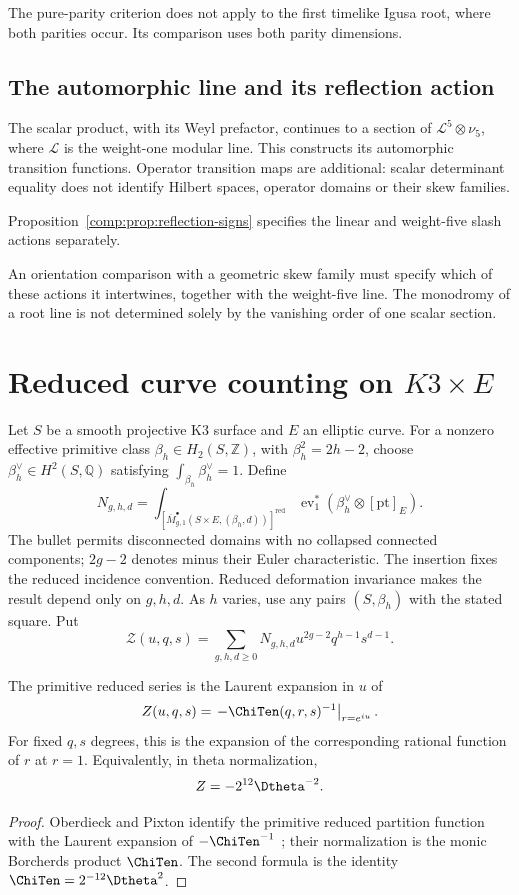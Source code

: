 The pure-parity criterion does not apply to the first timelike
Igusa root, where both parities occur. Its comparison uses both
parity dimensions.

\subsection{The automorphic line and its reflection action}
The scalar product, with its Weyl prefactor, continues to a section
of \(\mathcal L^5\otimes\nu_5\), where \(\mathcal L\) is
the weight-one modular line. This constructs its automorphic
transition functions. Operator transition maps are additional:
scalar determinant equality does not identify Hilbert spaces,
operator domains or their skew families.

Proposition~\ref{comp:prop:reflection-signs} specifies the linear
and weight-five slash actions separately.


An orientation comparison with a geometric skew family must specify
which of these actions it intertwines, together with the weight-five
line. The monodromy of a root line is not determined solely by the
vanishing order of one scalar section.

\section{Reduced curve counting on \texorpdfstring{$K3\times E$}{K3 x E}}
Let \(S\) be a smooth projective K3 surface and \(E\) an
elliptic curve. For a nonzero effective primitive class
\(\beta_h\in H_2(S,\mathbb Z)\), with \(\beta_h^2=2h-2\),
choose \(\beta_h^\vee\in H^2(S,\mathbb Q)\) satisfying
\(\int_{\beta_h}\beta_h^\vee=1\). Define
\[
 N_{g,h,d}=\int_{[\overline M_{g,1}^{\bullet}
       (S\times E,(\beta_h,d))]^{\mathrm{red}}}
       \operatorname{ev}_1^*(\beta_h^\vee\otimes[\mathrm{pt}]_E).
\]
The bullet permits disconnected domains with no collapsed connected
components; \(2g-2\) denotes minus their Euler characteristic.
The insertion fixes the reduced incidence convention. Reduced
deformation invariance makes the result depend only on $g,h,d$.
As $h$ varies, use any pairs $(S,\beta_h)$ with the stated square. Put
\[
 \mathcal Z(u,q,s)=\sum_{g,h,d\geq0}
                 N_{g,h,d}u^{2g-2}q^{h-1}s^{d-1}.
\]
\begin{theorem}
The primitive reduced series is the Laurent expansion in $u$ of
\[
 \mathcal Z(u,q,s)=
   \left.-\ChiTen(q,r,s)^{-1}\right|_{r=e^{iu}}.
\]
For fixed $q,s$ degrees, this is the expansion of the corresponding
rational function of $r$ at $r=1$.
Equivalently, in theta normalization,
\[
 \mathcal Z=-2^{12}\Dtheta^{-2}.
\]
\end{theorem}
\begin{proof}
Oberdieck and Pixton identify the primitive reduced partition function with the Laurent expansion of $-\ChiTen^{-1}$ \cite{OP}; their normalization is the monic Borcherds product $\ChiTen$. The second formula is the identity $\ChiTen=2^{-12}\Dtheta^2$.
\end{proof}


